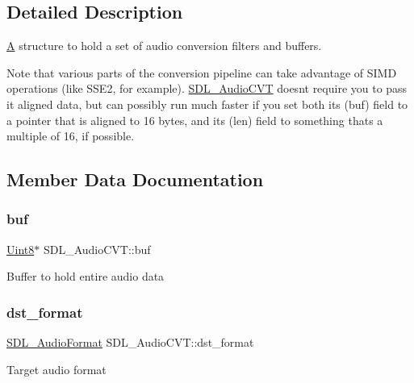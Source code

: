 \subsection{Detailed Description}
\mbox{\hyperlink{struct_a}{A}} structure to hold a set of audio conversion filters and buffers. 

Note that various parts of the conversion pipeline can take advantage of S\+I\+MD operations (like S\+S\+E2, for example). \mbox{\hyperlink{struct_s_d_l___audio_c_v_t}{S\+D\+L\+\_\+\+Audio\+C\+VT}} doesn\textquotesingle{}t require you to pass it aligned data, but can possibly run much faster if you set both its (buf) field to a pointer that is aligned to 16 bytes, and its (len) field to something that\textquotesingle{}s a multiple of 16, if possible. 

\subsection{Member Data Documentation}
\mbox{\label{struct_s_d_l___audio_c_v_t_a080db27b929efa983c5161360ffce310}} 
\subsubsection{\texorpdfstring{buf}{buf}}
{\footnotesize\ttfamily \mbox{\hyperlink{_s_d_l__stdinc_8h_a2944638813a090aa23e62f4da842c3e2}{Uint8}}$\ast$ S\+D\+L\+\_\+\+Audio\+C\+V\+T\+::buf}

Buffer to hold entire audio data \mbox{\label{struct_s_d_l___audio_c_v_t_a8f890d017be857a3b048bf00525736c6}} 
\subsubsection{\texorpdfstring{dst\_format}{dst\_format}}
{\footnotesize\ttfamily \mbox{\hyperlink{_s_d_l__audio_8h_a491ed103fd25d920c4e6b7495217ce66}{S\+D\+L\+\_\+\+Audio\+Format}} S\+D\+L\+\_\+\+Audio\+C\+V\+T\+::dst\+\_\+format}

Target audio format \mbox{\label{struct_s_d_l___audio_c_v_t_a35093b3ad3331c17416c593a76012b63}} 
